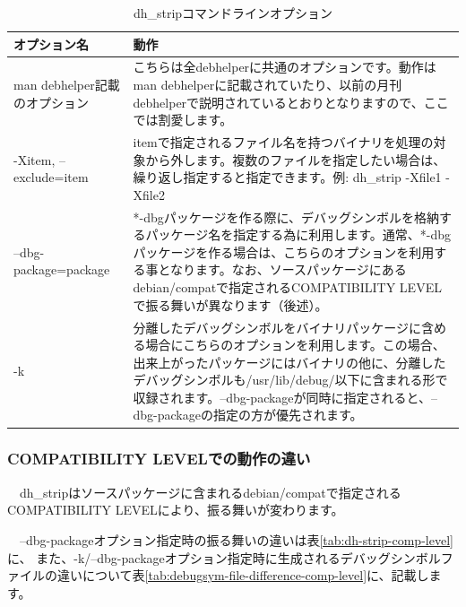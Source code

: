 \documentclass[mingoth,a4paper]{jsarticle}
\begin{document}
\begin{table}[ht]
\begin{center}
\small
\begin{tabular}{|p{8em}|p{35em}|}
\hline
オプション名&動作 \\ \hline \hline
man debhelper記載のオプション & こちらは全debhelperに共通のオプションです。動作はman debhelperに記載されていたり、以前の月刊debhelperで説明されているとおりとなりますので、ここでは割愛します。 \\ \hline
-Xitem, --exclude=item & itemで指定されるファイル名を持つバイナリを処理の対象から外します。複数のファイルを指定したい場合は、繰り返し指定すると指定できます。例: dh\_strip -Xfile1 -Xfile2 \\ \hline
--dbg-package=package & *-dbgパッケージを作る際に、デバッグシンボルを格納するパッケージ名を指定する為に利用します。通常、*-dbgパッケージを作る場合は、こちらのオプションを利用する事となります。なお、ソースパッケージにあるdebian/compatで指定されるCOMPATIBILITY LEVELで振る舞いが異なります（後述）。\\ \hline
-k & 分離したデバッグシンボルをバイナリパッケージに含める場合にこちらのオプションを利用します。この場合、出来上がったパッケージにはバイナリの他に、分離したデバッグシンボルも/usr/lib/debug/以下に含まれる形で収録されます。--dbg-packageが同時に指定されると、--dbg-packageの指定の方が優先されます。\\ \hline
\end{tabular}
\caption{dh\_stripコマンドラインオプション}
\label{tab:dh-strip-opt}
\end{center}
\end{table}

\subsubsection{COMPATIBILITY LEVELでの動作の違い}

　dh\_stripはソースパッケージに含まれるdebian/compatで指定される
COMPATIBILITY LEVELにより、振る舞いが変わります。

　--dbg-packageオプション指定時の振る舞いの違いは表\ref{tab:dh-strip-comp-level}に、
また、-k/--dbg-packageオプション指定時に生成されるデバッグシンボルファイルの違いについて表\ref{tab:debugsym-file-difference-comp-level}に、記載します。
\end{document}
